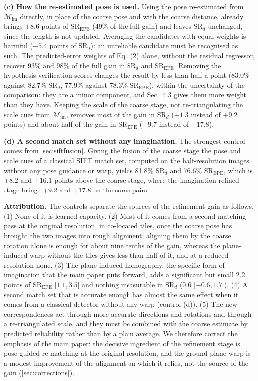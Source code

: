 \documentclass[10pt,twocolumn,letterpaper]{article}
\newcommand{\SRd}{SR$_{d}$}
\newcommand{\SRe}{SR$_{\mathrm{EPE}}$}
\newcommand{\ci}[2]{{\scriptsize[\ensuremath{#1},\,\ensuremath{#2}]}}
\begin{document}
\noindent\textbf{(c) How the re-estimated pose is used.} Using the pose re-estimated from $\mathcal{M}_{\mathrm{im}}$ directly, in place of the coarse pose and with the coarse distance, already brings \ensuremath{+8.6}{} points of \SRe{} (49\% of the full gain) and leaves \SRd{} unchanged, since the length is not updated. Averaging the candidates with equal weights is harmful (\ensuremath{-5.4}{} points of \SRd): an unreliable candidate must be recognised as such. The predicted-error weights of Eq.~(2) alone, without the residual regressor, recover 93\% and 98\% of the full gain in \SRd{} and \SRe. Removing the hypothesis-verification scores changes the result by less than half a point (83.0\% against 82.7\% \SRd, 77.9\% against 78.3\% \SRe), within the uncertainty of the comparison: they are a minor component, and Sec.~4.3 gives them more weight than they have. Keeping the scale of the coarse stage, \ie not re-triangulating the scale cues from $\mathcal{M}_{\mathrm{im}}$, removes most of the gain in \SRd{} (\ensuremath{+1.3}{} instead of \ensuremath{+9.2}{} points) and about half of the gain in \SRe{} (\ensuremath{+9.7}{} instead of \ensuremath{+17.8}).

\noindent\textbf{(d) A second match set without any imagination.} The strongest control comes from \cref{sec:siftfusion}. Giving the fusion of the coarse stage the pose and scale cues of a classical SIFT match set, computed on the half-resolution images without any pose guidance or warp, yields 81.8\% \SRd{} and 76.6\% \SRe, which is \ensuremath{+8.2}{} and \ensuremath{+16.1}{} points above the coarse stage, where the imagination-refined stage brings \ensuremath{+9.2}{} and \ensuremath{+17.8}{} on the same pairs.

\noindent\textbf{Attribution.} The controls separate the sources of the refinement gain as follows. (1) None of it is learned capacity. (2) Most of it comes from a second matching pass at the original resolution, in co-located tiles, once the coarse pose has brought the two images into rough alignment; aligning them by the coarse rotation alone is enough for about nine tenths of the gain, whereas the plane-induced warp without the tiles gives less than half of it, and at a reduced resolution none. (3) The plane-induced homography, the specific form of imagination that the main paper puts forward, adds a significant but small 2.2 points of \SRe{} \ci{1.1}{3.5} and nothing measurable in \SRd{} (0.6 \ci{\ensuremath{-0.6}}{1.7}). (4) A second match set that is accurate enough has almost the same effect when it comes from a classical detector without any warp (control (d)). (5) The new correspondences act through more accurate directions and rotations and through a re-triangulated scale, and they must be combined with the coarse estimate by predicted reliability rather than by a plain average. We therefore correct the emphasis of the main paper: the decisive ingredient of the refinement stage is pose-guided re-matching at the original resolution, and the ground-plane warp is a modest improvement of the alignment on which it relies, not the source of the gain (\cref{sec:corrections}).
\end{document}
